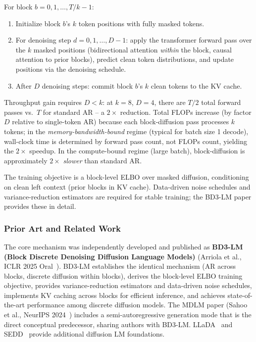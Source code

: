 \documentclass[11pt]{article}
\begin{document}
For block $b = 0, 1, \ldots, T/k - 1$:
\begin{enumerate}
    \item Initialize block $b$'s $k$ token positions with fully masked tokens.
    \item For denoising step $d = 0, 1, \ldots, D-1$: apply the transformer forward pass over the $k$ masked positions (bidirectional attention \emph{within} the block, causal attention to prior blocks), predict clean token distributions, and update positions via the denoising schedule.
    \item After $D$ denoising steps: commit block $b$'s $k$ clean tokens to the KV cache.
\end{enumerate}
Throughput gain requires $D < k$: at $k=8$, $D=4$, there are $T/2$ total forward passes vs.\ $T$ for standard AR -- a $2\times$ reduction. Total FLOPs increase (by factor $D$ relative to single-token AR) because each block-diffusion pass processes $k$ tokens; in the \emph{memory-bandwidth-bound} regime (typical for batch size 1 decode), wall-clock time is determined by forward pass count, not FLOPs count, yielding the $2\times$ speedup. In the compute-bound regime (large batch), block-diffusion is approximately $2\times$ \emph{slower} than standard AR.

The training objective is a block-level ELBO over masked diffusion, conditioning on clean left context (prior blocks in KV cache). Data-driven noise schedules and variance-reduction estimators are required for stable training; the BD3-LM paper provides these in detail.

\subsubsection*{Prior Art and Related Work}

The core mechanism was independently developed and published as \textbf{BD3-LM (Block Discrete Denoising Diffusion Language Models)} (Arriola et al., ICLR 2025 Oral~\cite{arriola2025bd3lm}). BD3-LM establishes the identical mechanism (AR across blocks, discrete diffusion within blocks), derives the block-level ELBO training objective, provides variance-reduction estimators and data-driven noise schedules, implements KV caching across blocks for efficient inference, and achieves state-of-the-art performance among discrete diffusion models. The MDLM paper (Sahoo et al., NeurIPS 2024~\cite{sahoo2024mdlm}) includes a semi-autoregressive generation mode that is the direct conceptual predecessor, sharing authors with BD3-LM. LLaDA~\cite{nie2025llada} and SEDD~\cite{lou2024sedd} provide additional diffusion LM foundations.
\end{document}
